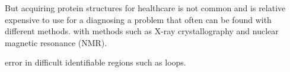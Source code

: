 But acquiring protein structures for healthcare is not common and is relative expensive to use for a diagnosing a problem that often can be found with different methods.  with methods such as X-ray crystallography and nuclear magnetic resonance (NMR).

 error in difficult identifiable regions such as loops.


%
%
%
%
%

%
%
%
%
%
%
%
%
%
%
%
%
%
%
%
%

%
%
%

